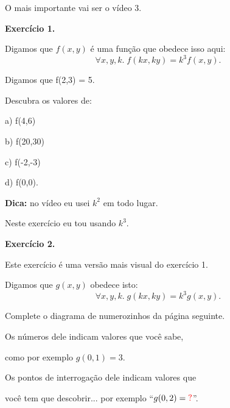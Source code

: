 \documentclass[oneside,12pt]{article}
\begin{document}
\msk

O mais importante vai ser o vídeo 3.

\newpage


{\bf Exercício 1.}

Digamos que $f(x,y)$ é uma função que obedece isso aqui:
%
$$∀x,y,k. \; f(kx,ky) = k^3 f(x,y).$$

Digamos que f(2,3) = 5.

\msk

Descubra os valores de:

\ssk

a) f(4,6)

b) f(20,30)

c) f(-2,-3)

d) f(0,0).


\bsk

{\bf Dica:} no vídeo eu usei $k^2$ em todo lugar.

Neste exercício eu tou usando $k^3$.



\newpage


{\bf Exercício 2.}

Este exercício é uma versão mais visual do exercício 1.

Digamos que $g(x,y)$ obedece isto:
%
$$∀x,y,k. \; g(kx,ky) = k^3 g(x,y).$$

Complete o diagrama de numerozinhos da página seguinte.

Os números dele indicam valores que você sabe,

como por exemplo $g(0,1)=3$.


Os pontos de interrogação dele indicam valores que

você tem que descobrir... por exemplo ``$g(0,2)=\ColorRed{?}$''.

\newpage


\unitlength=8pt
\celllower=2.5pt
\def\cellfont{\footnotesize}
\def\cellfont{\scriptsize}

\unitlength=15pt
\end{document}
